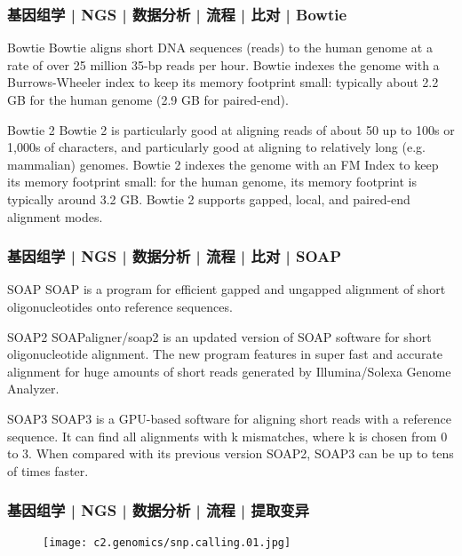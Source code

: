 \begin{frame}
  \frametitle{基因组学 | NGS | 数据分析 | 流程 | 比对 | Bowtie}
  \begin{block}{Bowtie}
 Bowtie aligns short DNA sequences (reads) to the human genome at a rate of over 25 million 35-bp reads per hour. Bowtie indexes the genome with a Burrows-Wheeler index to keep its memory footprint small: typically about 2.2 GB for the human genome (2.9 GB for paired-end).
  \end{block}
  \pause
  \begin{block}{Bowtie 2}
    Bowtie 2 is particularly good at aligning reads of about 50 up to 100s or 1,000s of characters, and particularly good at aligning to relatively long (e.g. mammalian) genomes. Bowtie 2 indexes the genome with an FM Index to keep its memory footprint small: for the human genome, its memory footprint is typically around 3.2 GB. Bowtie 2 supports gapped, local, and paired-end alignment modes.
  \end{block}
\end{frame}

\begin{frame}
  \frametitle{基因组学 | NGS | 数据分析 | 流程 | 比对 | SOAP}
  \begin{block}{SOAP}
    SOAP is a program for efficient gapped and ungapped alignment of short oligonucleotides onto reference sequences.
  \end{block}
  \pause
  \begin{block}{SOAP2}
    SOAPaligner/soap2 is an updated version of SOAP software for short oligonucleotide alignment. The new program features in super fast and accurate alignment for huge amounts of short reads generated by Illumina/Solexa Genome Analyzer.
  \end{block}
  \pause
  \begin{block}{SOAP3}
    SOAP3 is a GPU-based software for aligning short reads with a reference sequence. It can find all alignments with k mismatches, where k is chosen from 0 to 3. When compared with its previous version SOAP2, SOAP3 can be up to tens of times faster.
  \end{block}
\end{frame}

\begin{frame}
  \frametitle{基因组学 | NGS | 数据分析 | 流程 | 提取变异}
  \begin{figure}
    \centering
    \texttt{[image: c2.genomics/snp.calling.01.jpg]}
  \end{figure}
\end{frame}

